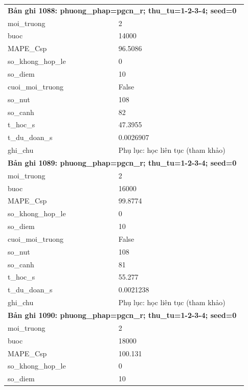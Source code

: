 \begin{longtable}{p{0.43\linewidth}p{0.50\linewidth}}
\midrule
\multicolumn{2}{p{0.95\linewidth}}{\textbf{Bản ghi 1088: phuong\_phap=pgcn\_r; thu\_tu=1-2-3-4; seed=0}} \\
moi\_\allowbreak truong & 2 \\
buoc & 14000 \\
MAPE\_\allowbreak Csp & 96.5086 \\
so\_\allowbreak khong\_\allowbreak hop\_\allowbreak le & 0 \\
so\_\allowbreak diem & 10 \\
cuoi\_\allowbreak moi\_\allowbreak truong & False \\
so\_\allowbreak nut & 108 \\
so\_\allowbreak canh & 82 \\
t\_\allowbreak hoc\_\allowbreak s & 47.3955 \\
t\_\allowbreak du\_\allowbreak doan\_\allowbreak s & 0.0026907 \\
ghi\_\allowbreak chu & Phụ lục: học liên tục (tham khảo) \\
\midrule
\multicolumn{2}{p{0.95\linewidth}}{\textbf{Bản ghi 1089: phuong\_phap=pgcn\_r; thu\_tu=1-2-3-4; seed=0}} \\
moi\_\allowbreak truong & 2 \\
buoc & 16000 \\
MAPE\_\allowbreak Csp & 99.8774 \\
so\_\allowbreak khong\_\allowbreak hop\_\allowbreak le & 0 \\
so\_\allowbreak diem & 10 \\
cuoi\_\allowbreak moi\_\allowbreak truong & False \\
so\_\allowbreak nut & 108 \\
so\_\allowbreak canh & 81 \\
t\_\allowbreak hoc\_\allowbreak s & 55.277 \\
t\_\allowbreak du\_\allowbreak doan\_\allowbreak s & 0.0021238 \\
ghi\_\allowbreak chu & Phụ lục: học liên tục (tham khảo) \\
\midrule
\multicolumn{2}{p{0.95\linewidth}}{\textbf{Bản ghi 1090: phuong\_phap=pgcn\_r; thu\_tu=1-2-3-4; seed=0}} \\
moi\_\allowbreak truong & 2 \\
buoc & 18000 \\
MAPE\_\allowbreak Csp & 100.131 \\
so\_\allowbreak khong\_\allowbreak hop\_\allowbreak le & 0 \\
so\_\allowbreak diem & 10 \\

\end{longtable}
